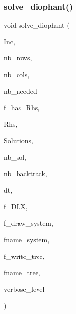 \subsubsection{\texorpdfstring{solve\+\_\+diophant()}{solve\_diophant()}}
{\footnotesize\ttfamily void solve\+\_\+diophant (\begin{DoxyParamCaption}\item[{\mbox{\hyperlink{galois_8h_a09fddde158a3a20bd2dcadb609de11dc}{I\+NT}} $\ast$}]{Inc,  }\item[{\mbox{\hyperlink{galois_8h_a09fddde158a3a20bd2dcadb609de11dc}{I\+NT}}}]{nb\+\_\+rows,  }\item[{\mbox{\hyperlink{galois_8h_a09fddde158a3a20bd2dcadb609de11dc}{I\+NT}}}]{nb\+\_\+cols,  }\item[{\mbox{\hyperlink{galois_8h_a09fddde158a3a20bd2dcadb609de11dc}{I\+NT}}}]{nb\+\_\+needed,  }\item[{\mbox{\hyperlink{galois_8h_a09fddde158a3a20bd2dcadb609de11dc}{I\+NT}}}]{f\+\_\+has\+\_\+\+Rhs,  }\item[{\mbox{\hyperlink{galois_8h_a09fddde158a3a20bd2dcadb609de11dc}{I\+NT}} $\ast$}]{Rhs,  }\item[{\mbox{\hyperlink{galois_8h_a09fddde158a3a20bd2dcadb609de11dc}{I\+NT}} $\ast$\&}]{Solutions,  }\item[{\mbox{\hyperlink{galois_8h_a09fddde158a3a20bd2dcadb609de11dc}{I\+NT}} \&}]{nb\+\_\+sol,  }\item[{\mbox{\hyperlink{galois_8h_a09fddde158a3a20bd2dcadb609de11dc}{I\+NT}} \&}]{nb\+\_\+backtrack,  }\item[{\mbox{\hyperlink{galois_8h_a09fddde158a3a20bd2dcadb609de11dc}{I\+NT}} \&}]{dt,  }\item[{\mbox{\hyperlink{galois_8h_a09fddde158a3a20bd2dcadb609de11dc}{I\+NT}}}]{f\+\_\+\+D\+LX,  }\item[{\mbox{\hyperlink{galois_8h_a09fddde158a3a20bd2dcadb609de11dc}{I\+NT}}}]{f\+\_\+draw\+\_\+system,  }\item[{const \mbox{\hyperlink{galois_8h_ab6cc7b4aeb6ea31aba2b3fbfc83ff5e6}{B\+Y\+TE}} $\ast$}]{fname\+\_\+system,  }\item[{\mbox{\hyperlink{galois_8h_a09fddde158a3a20bd2dcadb609de11dc}{I\+NT}}}]{f\+\_\+write\+\_\+tree,  }\item[{const \mbox{\hyperlink{galois_8h_ab6cc7b4aeb6ea31aba2b3fbfc83ff5e6}{B\+Y\+TE}} $\ast$}]{fname\+\_\+tree,  }\item[{\mbox{\hyperlink{galois_8h_a09fddde158a3a20bd2dcadb609de11dc}{I\+NT}}}]{verbose\+\_\+level }\end{DoxyParamCaption})}

